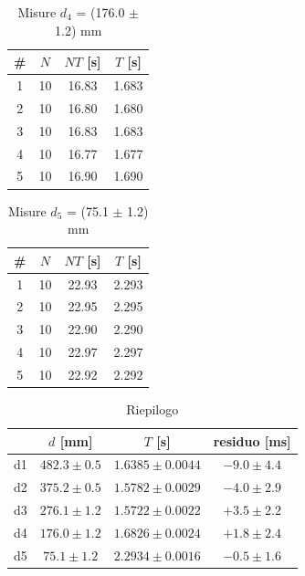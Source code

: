 \begin{table}[H]
    \centering
    \begin{tabular}{c|c|c|c}
      \# & $N$ & $NT$ [s] & $T$ [s] \\
      \hline
      1 & 10 & 16.83 & 1.683 \\
      2 & 10 & 16.80 & 1.680 \\
      3 & 10 & 16.83 & 1.683 \\
      4 & 10 & 16.77 & 1.677 \\
      5 & 10 & 16.90 & 1.690 \\
    \end{tabular}
    \caption{Misure $d_4$ = (176.0 $\pm$ 1.2) mm}
    \label{tab:misure_d4}
\end{table}

\begin{table}[H]
    \centering
    \begin{tabular}{c|c|c|c}
      \# & $N$ & $NT$ [s] & $T$ [s] \\
      \hline
      1 & 10 & 22.93 & 2.293 \\
      2 & 10 & 22.95 & 2.295 \\
      3 & 10 & 22.90 & 2.290 \\
      4 & 10 & 22.97 & 2.297 \\
      5 & 10 & 22.92 & 2.292 \\
    \end{tabular}
    \caption{Misure $d_5$ = (75.1 $\pm$ 1.2) mm}
    \label{tab:misure_d5}
\end{table}

\begin{table}[H]
    \centering
    \begin{tabular}{c|c|c|c}
       & $d$ [mm] & $T$ [s] & residuo [ms] \\
      \hline
      d1 & $482.3 \pm 0.5$ & $1.6385 \pm 0.0044$ & $-9.0 \pm 4.4$ \\
      d2 & $375.2 \pm 0.5$ & $1.5782 \pm 0.0029$ & $-4.0 \pm 2.9$ \\
      d3 & $276.1 \pm 1.2$ & $1.5722 \pm 0.0022$ & $+3.5 \pm 2.2$ \\
      d4 & $176.0 \pm 1.2$ & $1.6826 \pm 0.0024$ & $+1.8 \pm 2.4$ \\
      d5 & $75.1 \pm 1.2$ & $2.2934 \pm 0.0016$ & $-0.5 \pm 1.6$ \\
    \end{tabular}
    \caption{Riepilogo}
    \label{tab:riepilogo}
\end{table}

